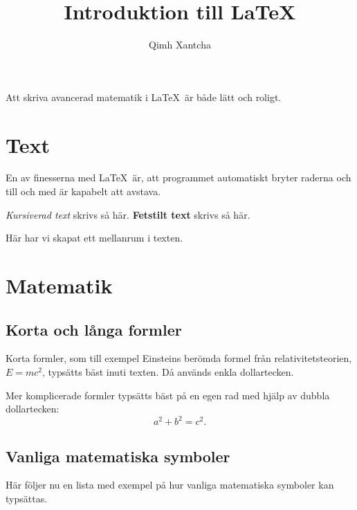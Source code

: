\documentclass{article}
\begin{document}


\title{Introduktion till \LaTeX}
\author{Qimh Xantcha}
\maketitle 

\noindent 
Att skriva avancerad matematik i \LaTeX~är både lätt och roligt.  






\section{Text}


En av finesserna med \LaTeX~är, att programmet automatiskt bryter raderna och till och med är kapabelt att avstava.


\emph{Kursiverad text} skrivs så här. 
\textbf{Fetstilt text} skrivs så här. 

\bigskip
Här har vi skapat ett mellanrum i texten.






\section{Matematik}

\subsection{Korta och långa formler}

Korta formler, som till exempel Einsteins berömda formel från relativitetsteorien,
$E=mc^2$, typsätts bäst inuti texten.
Då används enkla dollartecken. 

Mer komplicerade formler typsätts bäst på en egen rad med hjälp av dubbla dollartecken:
$$
a^2 + b^2 = c^2.
$$



\subsection{Vanliga matematiska symboler}

Här följer nu en lista med exempel på hur vanliga matematiska symboler kan typsättas. 
\end{document}
